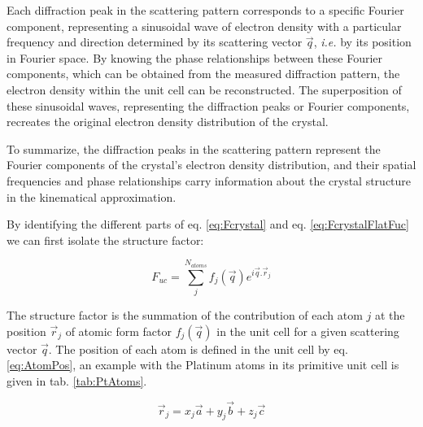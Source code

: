 Each diffraction peak in the scattering pattern corresponds to a specific Fourier component, representing a sinusoidal wave of electron density with a particular frequency and direction determined by its scattering vector $\vec{q}$, {\color{DarkOrange}\textit{i.e.}} by its position in Fourier space.
By knowing the phase relationships between these Fourier components, which can be obtained from the measured diffraction pattern, the electron density within the unit cell can be reconstructed.
The superposition of these sinusoidal waves, representing the diffraction peaks or Fourier components, recreates the original electron density distribution of the crystal.

To summarize, the diffraction peaks in the scattering pattern represent the Fourier components of the crystal's electron density distribution, and their spatial frequencies and phase relationships carry information about the crystal structure {\color{DarkOrange}in the kinematical approximation}.

By identifying the different parts of eq. \ref{eq:Fcrystal} and eq. \ref{eq:FcrystalFlatFuc} we can first isolate the structure factor:

\begin{equation}
    \label{eq:StrucFactor}
    F_{uc} = \sum_j^{N_{atoms}} f_j(\vec{q}) e^{i\vec{q}.\vec{r}_j}
\end{equation}

The structure factor is the summation of the contribution of each atom $j$ at the position $\vec{r}_j$ of atomic form factor $f_j(\vec{q})$ in the unit cell for a given scattering vector $\vec{q}$.
The position of each atom is defined in the unit cell by eq. \ref{eq:AtomPos}, an example with the Platinum atoms in its primitive unit cell is given in tab. \ref{tab:PtAtoms}.

\begin{equation}
    \label{eq:AtomPos}
    \vec{r}_j = x_j\vec{a} + y_j\vec{b} + z_j\vec{c}
\end{equation}

